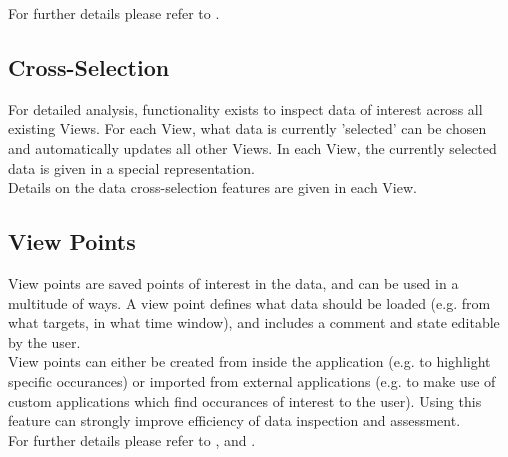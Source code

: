 For further details please refer to .

\subsection{Cross-Selection}

For detailed analysis, functionality exists to inspect data of interest across all existing Views. For each View, what data is currently 'selected' can be chosen and automatically updates all other Views. In each View, the currently selected data is given in a special representation. \\

Details on the data cross-selection features are given in each View.

\subsection{View Points}

View points are saved points of interest in the data, and can be used in a multitude of ways. A view point defines what data should be loaded (e.g. from what targets, in what time window), and includes a comment and state editable by the user.  \\
View points can either be created from inside the application (e.g. to highlight specific occurances) or imported from external applications (e.g. to make use of custom applications which find occurances of interest to the user). Using this feature can strongly improve efficiency of data inspection and assessment. \\

For further details please refer to ,  and .
